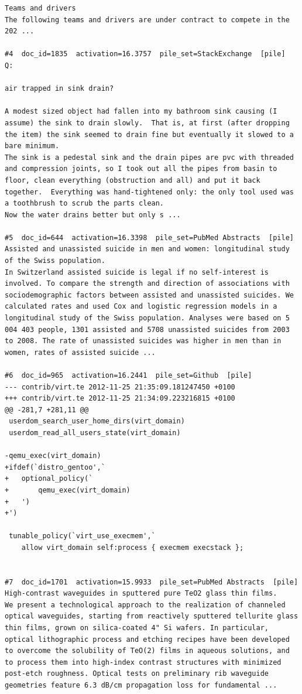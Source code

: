\begin{verbatim}
Teams and drivers 
The following teams and drivers are under contract to compete in the 202 ...

#4  doc_id=1835  activation=16.3757  pile_set=StackExchange  [pile]
Q:

air trapped in sink drain?

A modest sized object had fallen into my bathroom sink causing (I assume) the sink to drain slowly.  That is, at first (after dropping the item) the sink seemed to drain fine but eventually it slowed to a bare minimum.  
The sink is a pedestal sink and the drain pipes are pvc with threaded and compression joints, so I took out all the pipes from basin to floor, clean everything (obstruction and all) and put it back together.  Everything was hand-tightened only: the only tool used was a toothbrush to scrub the parts clean.  
Now the water drains better but only s ...

#5  doc_id=644  activation=16.3398  pile_set=PubMed Abstracts  [pile]
Assisted and unassisted suicide in men and women: longitudinal study of the Swiss population.
In Switzerland assisted suicide is legal if no self-interest is involved. To compare the strength and direction of associations with sociodemographic factors between assisted and unassisted suicides. We calculated rates and used Cox and logistic regression models in a longitudinal study of the Swiss population. Analyses were based on 5 004 403 people, 1301 assisted and 5708 unassisted suicides from 2003 to 2008. The rate of unassisted suicides was higher in men than in women, rates of assisted suicide ...

#6  doc_id=965  activation=16.2441  pile_set=Github  [pile]
--- contrib/virt.te	2012-11-25 21:35:09.181247450 +0100
+++ contrib/virt.te	2012-11-25 21:34:09.223216815 +0100
@@ -281,7 +281,11 @@
 userdom_search_user_home_dirs(virt_domain)
 userdom_read_all_users_state(virt_domain)
 
-qemu_exec(virt_domain)
+ifdef(`distro_gentoo',`
+	optional_policy(`
+		qemu_exec(virt_domain)
+	')
+')
 
 tunable_policy(`virt_use_execmem',`
 	allow virt_domain self:process { execmem execstack };


#7  doc_id=1701  activation=15.9933  pile_set=PubMed Abstracts  [pile]
High-contrast waveguides in sputtered pure TeO2 glass thin films.
We present a technological approach to the realization of channeled optical waveguides, starting from reactively sputtered tellurite glass thin films, grown on silica-coated 4" Si wafers. In particular, optical lithographic process and etching recipes have been developed to overcome the solubility of TeO(2) films in aqueous solutions, and to process them into high-index contrast structures with minimized post-etch roughness. Optical tests on preliminary rib waveguide geometries feature 6.3 dB/cm propagation loss for fundamental ...


\end{verbatim}
